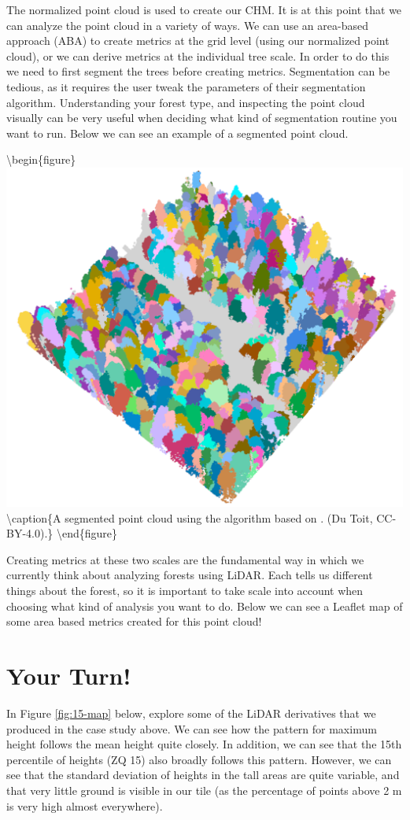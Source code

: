 \documentclass[
]{book}
\begin{document}
The normalized point cloud is used to create our CHM. It is at this point that we can analyze the point cloud in a variety of ways. We can use an area-based approach (ABA) to create metrics at the grid level (using our normalized point cloud), or we can derive metrics at the individual tree scale. In order to do this we need to first segment the trees before creating metrics. Segmentation can be tedious, as it requires the user tweak the parameters of their segmentation algorithm. Understanding your forest type, and inspecting the point cloud visually can be very useful when deciding what kind of segmentation routine you want to run. Below we can see an example of a segmented point cloud.

\textbackslash begin\{figure\}
\includegraphics[width=0.6\linewidth]{images/15-las-segmented} \textbackslash caption\{A segmented point cloud using the algorithm based on \citet{dalponte_tree-centric_2016}. (Du Toit, CC-BY-4.0).\}\label{fig:15-las-segmented}
\textbackslash end\{figure\}

Creating metrics at these two scales are the fundamental way in which we currently think about analyzing forests using LiDAR. Each tells us different things about the forest, so it is important to take scale into account when choosing what kind of analysis you want to do. Below we can see a Leaflet map of some area based metrics created for this point cloud!

\hypertarget{your-turn-10}{%
\section*{Your Turn!}\label{your-turn-10}}

In Figure \ref{fig:15-map} below, explore some of the LiDAR derivatives that we produced in the case study above. We can see how the pattern for maximum height follows the mean height quite closely. In addition, we can see that the 15th percentile of heights (ZQ 15) also broadly follows this pattern. However, we can see that the standard deviation of heights in the tall areas are quite variable, and that very little ground is visible in our tile (as the percentage of points above 2 m is very high almost everywhere).
\end{document}
